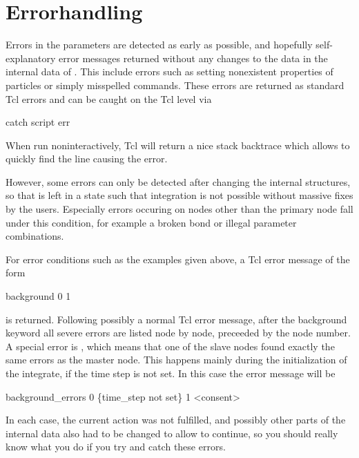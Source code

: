 \section{Errorhandling}
Errors in the parameters are detected as early as possible, and
hopefully self-explanatory error messages returned without any changes
to the data in the internal data of \es. This include errors such as
setting nonexistent properties of particles or simply misspelled
commands. These errors are returned as standard Tcl errors and can be
caught on the Tcl level via
\begin{tclcode}
catch {script} err 
\end{tclcode}
When run noninteractively, Tcl will return a nice stack backtrace
which allows to quickly find the line causing the error.

However, some errors can only be detected after changing the internal
structures, so that \es is left in a state such that integration is
not possible without massive fixes by the users. Especially errors
occuring on nodes other than the primary node fall under this
condition, for example a broken bond or illegal parameter
combinations.

For error conditions such as the examples given above, a Tcl error
message of the form
\begin{code}
 background 0   1 
\end{code}
is returned. Following possibly a normal Tcl error message, after the
background keyword all severe errors are listed node by node,
preceeded by the node number. A special error is ,
which means that one of the slave nodes found exactly the same errors
as the master node. This happens mainly during the initialization of
the integrate, \eg if the time step is not set. In this case the error
message will be
\begin{code}
background\_errors 0 \{time\_step not set\} 1 <consent> 
\end{code}
In each case, the current action was not fulfilled, and possibly other
parts of the internal data also had to be changed to allow \es to
continue, so you should really know what you do if you try and catch
these errors.


